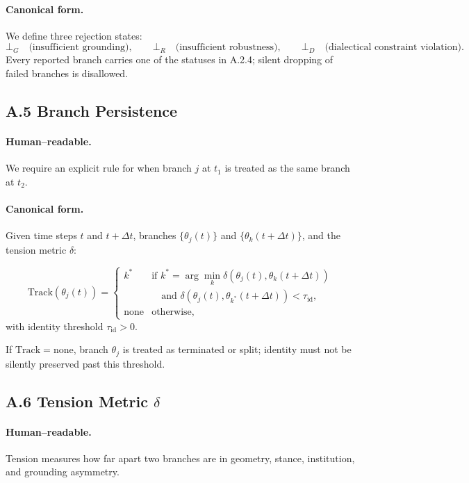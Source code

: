 \documentclass[11pt, a4paper]{article}
\begin{document}
\paragraph{Canonical form.}
We define three rejection states:
\[
\bot_G \quad \text{(insufficient grounding)}, \qquad
\bot_R \quad \text{(insufficient robustness)}, \qquad
\bot_D \quad \text{(dialectical constraint violation)}.
\]
Every reported branch carries one of the statuses in A.2.4; silent dropping of failed branches is disallowed.

\subsection*{A.5 \quad Branch Persistence}
\label{sec:A5}

\paragraph{Human–readable.}
We require an explicit rule for when branch $j$ at $t_1$ is treated as the same branch at $t_2$.

\paragraph{Canonical form.}
Given time steps $t$ and $t+\Delta t$, branches $\{\theta_j(t)\}$ and $\{\theta_k(t+\Delta t)\}$, and the tension metric $\delta$:

\[
\mathrm{Track}(\theta_j(t)) =
\begin{cases}
k^* & \text{if } k^* = \arg\min_k \delta(\theta_j(t), \theta_k(t+\Delta t))\\
    & \quad \text{and } \delta(\theta_j(t), \theta_{k^*}(t+\Delta t)) < \tau_{\mathrm{id}},\\[4pt]
\text{none} & \text{otherwise,}
\end{cases}
\]
with identity threshold $\tau_{\mathrm{id}} > 0$.

If $\mathrm{Track} = \text{none}$, branch $\theta_j$ is treated as terminated or split; identity must not be silently preserved past this threshold.

\subsection*{A.6 \quad Tension Metric $\delta$}
\label{sec:A6}

\paragraph{Human–readable.}
Tension measures how far apart two branches are in geometry, stance, institution, and grounding asymmetry.
\end{document}
